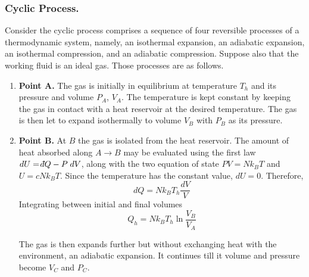 \documentclass[../../../Main.tex]{subfiles}
\begin{document}
\subsubsection{Cyclic Process.} Consider the cyclic process comprises a sequence of four reversible processes of a thermodynamic system, namely, an isothermal expansion, an adiabatic expansion, an isothermal compression, and an adiabatic compression. Suppose also that the working fluid is an ideal gas. Those processes are as follows.

\begin{enumerate}
    \item \textbf{Point A.} The gas is initially in equilibrium at temperature $T_h$ and its pressure and volume $P_A $, $V_A$. The temperature is kept constant by keeping the gas in contact with a heat reservoir at the desired temperature. The gas is then let to expand isothermally to volume $V_B$ with $P_B$ as its pressure.

    \item \textbf{Point B.} At $B$ the gas is isolated from the heat reservoir. The amount of heat absorbed along $A\rightarrow B$ may be evaluated using the first law $dU=\dbar Q-P\;dV$, along with the two equation of state $PV=Nk_BT$ and $U=cNk_BT$. Since the temperature has the constant value, $dU=0$. Therefore,
    \begin{equation*}
        dQ=Nk_BT_h  \frac{dV}{V}
    \end{equation*}
    Integrating between initial and final volumes
    \begin{equation*}
        Q_h=Nk_BT_h \ln \frac{V_B}{V_A}
    \end{equation*}

    The gas is then expands further but without exchanging heat with the environment, an adiabatic expansion. It continues till it volume and pressure become $V_C$ and $P_C$.


\end{enumerate}
\end{document}
